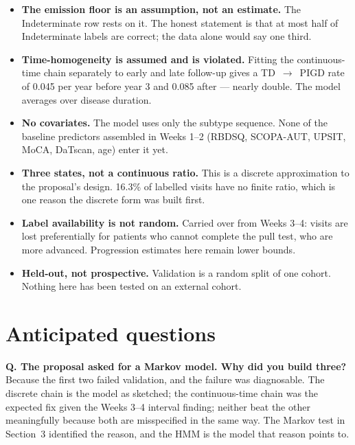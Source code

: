 \documentclass[11pt,a4paper]{article}
\newcommand{\arr}{$\rightarrow$}
\begin{document}
\begin{itemize}
  \item \textbf{The emission floor is an assumption, not an estimate.} The
        Indeterminate row rests on it. The honest statement is that at most
        half of Indeterminate labels are correct; the data alone would say
        one third.

  \item \textbf{Time-homogeneity is assumed and is violated.} Fitting the
        continuous-time chain separately to early and late follow-up gives a
        TD~\arr~PIGD rate of 0.045 per year before year 3 and 0.085 after ---
        nearly double. The model averages over disease duration.

  \item \textbf{No covariates.} The model uses only the subtype sequence. None
        of the baseline predictors assembled in Weeks 1--2 (RBDSQ, SCOPA-AUT,
        UPSIT, MoCA, DaTscan, age) enter it yet.

  \item \textbf{Three states, not a continuous ratio.} This is a discrete
        approximation to the proposal's design. 16.3\% of labelled visits have
        no finite ratio, which is one reason the discrete form was built first.

  \item \textbf{Label availability is not random.} Carried over from Weeks
        3--4: visits are lost preferentially for patients who cannot complete
        the pull test, who are more advanced. Progression estimates here remain
        lower bounds.

  \item \textbf{Held-out, not prospective.} Validation is a random split of one
        cohort. Nothing here has been tested on an external cohort.
\end{itemize}

\section{Anticipated questions}

\noindent\textbf{Q. The proposal asked for a Markov model. Why did you build three?}\\
Because the first two failed validation, and the failure was diagnosable. The
discrete chain is the model as sketched; the continuous-time chain was the
expected fix given the Weeks 3--4 interval finding; neither beat the other
meaningfully because both are misspecified in the same way. The Markov test in
Section~3 identified the reason, and the HMM is the model that reason points to.
\end{document}
